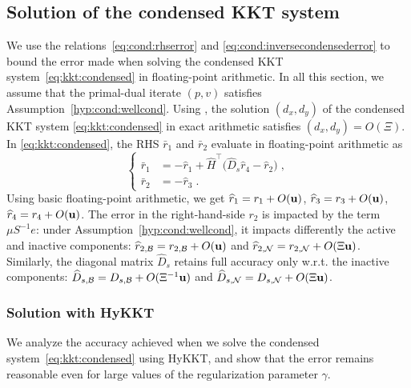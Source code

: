 \subsection{Solution of the condensed KKT system}
We use the relations~\eqref{eq:cond:rhserror} and \eqref{eq:cond:inversecondensederror}
to bound the error made when solving the condensed KKT system~\eqref{eq:kkt:condensed}
in floating-point arithmetic.
In all this section, we assume that
the primal-dual iterate $(p,v)$ satisfies Assumption~\ref{hyp:cond:wellcond}.
Using \cite[Corollary 3.3]{wright2001effects}, the solution $(d_x, d_y)$ of the
condensed KKT system \eqref{eq:kkt:condensed} in exact arithmetic satisfies
$(d_x, d_y) = O(\Xi)$.
In \eqref{eq:kkt:condensed}, the RHS $\bar{r}_1$ and $\bar{r}_2$
evaluate in floating-point arithmetic as
\begin{equation}
  \label{eq:cond:condensedrhs}
  \left\{
  \begin{aligned}
    \bar{r}_1 &= - \widehat{r}_1 + \widehat{H}^\top\big(\widehat{D}_{s} \widehat{r}_{4} - \widehat{r}_{2} \big) \;, \\
     \bar{r}_2 &= -\widehat{r}_3 \; .
  \end{aligned}
  \right.
\end{equation}
Using basic floating-point arithmetic, we get
$\widehat{r}_1 = r_1 + O(\mathbf{u})$,
$\widehat{r}_3 = r_3 + O(\mathbf{u})$,
$\widehat{r}_4 = r_4 + O(\mathbf{u})$.
The error in the right-hand-side $r_2$ is impacted by the term $\mu S^{-1}e$:
under Assumption~\ref{hyp:cond:wellcond}, it impacts differently
the active and inactive components:
$\widehat{r}_{2,\mathcal{B}}= r_{2,\mathcal{B}} + O(\mathbf{u})$ and
$\widehat{r}_{2,\mathcal{N}}= r_{2,\mathcal{N}} + O(\Xi \mathbf{u})$.
Similarly, the diagonal matrix $\widehat{D}_s$ retains full accuracy only
w.r.t. the inactive components: $\widehat{D}_{s,\mathcal{B}} = D_{s,\mathcal{B}} + O(\Xi^{-1} \mathbf{u})$
and $\widehat{D}_{s,\mathcal{N}} = D_{s,\mathcal{N}} + O(\Xi \mathbf{u})$.

\subsubsection{Solution with HyKKT}
We analyze the accuracy achieved when we solve the condensed system~\eqref{eq:kkt:condensed}
using HyKKT,
and show that the error remains reasonable even for large values of
the regularization parameter $\gamma$.

